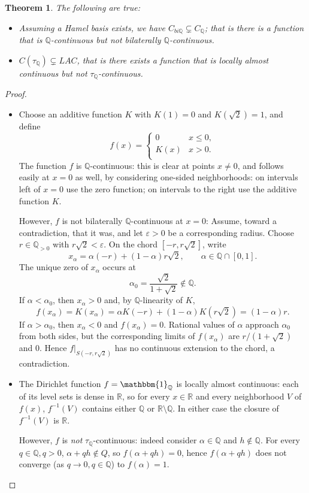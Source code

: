 \documentclass[11pt]{amsart} %
\newtheorem{theorem}{Theorem}[section]
\theoremstyle{definition}
\newcommand{\R}{\mathbb{R}}
\newcommand{\Q}{\mathbb{Q}}
\begin{document}
\begin{theorem} The following are true: 
\begin{itemize} 
\item[(a). ] Assuming a Hamel basis exists, we have $C_{bi\Q}\subsetneq C_{\Q}$; that is there is a function that is $\Q$-continuous but not bilaterally $\Q$-continuous. 
\item[(b). ] $C(\tau_{\Q})\subsetneq LAC$, that is there exists a function that is locally almost continuous but not $\tau_{\Q}$-continuous. 
\end{itemize} 
\end{theorem} 
\begin{proof} 
\begin{itemize} 
\item[(a). ] Choose an additive function $K$ with $K(1)=0$ and $K(\sqrt{2})=1$, and define 
\begin{equation} 
f(x)=\left\{\begin{array}{cc}
0 & x\leq 0, \\
K(x) & x>0. \\
\end{array} 
\right. 
\end{equation} 
The function $f$ is $\Q$-continuous: this is clear at points $x\neq 0$, and follows easily at $x=0$ as well, by considering one-sided neighborhoods: on intervals left of $x=0$ use the zero function; on intervals to the right use the additive function $K$. 


However, $f$ is not bilaterally $\Q$-continuous at $x=0$: 
Assume, toward a contradiction, that it was, and let \(\varepsilon>0\) be a corresponding radius. Choose \(r\in\Q_{>0}\) with \(r\sqrt2<\varepsilon\). On the chord \([-r,r\sqrt2]\), write
\[
 x_\alpha=\alpha(-r)+(1-\alpha)r\sqrt2,
 \qquad \alpha\in\Q\cap[0,1].
\]
The unique zero of \(x_\alpha\) occurs at
\[
 \alpha_0=\frac{\sqrt2}{1+\sqrt2}\notin\Q.
\]
If \(\alpha<\alpha_0\), then \(x_\alpha>0\) and, by \(\Q\)-linearity of \(K\),
\[
 f(x_\alpha)=K(x_\alpha)
 =\alpha K(-r)+(1-\alpha)K(r\sqrt2)
 =(1-\alpha)r.
\]
If \(\alpha>\alpha_0\), then \(x_\alpha<0\) and \(f(x_\alpha)=0\). Rational values of \(\alpha\) approach \(\alpha_0\) from both sides, but the corresponding limits of \(f(x_\alpha)\) are \(r/(1+\sqrt2)\) and \(0\). Hence \(f|_{S(-r,r\sqrt2)}\) has no continuous extension to the chord, a contradiction.
 
\item[(b). ] The Dirichlet function $f=\mathbbm{1}_{\Q}$ is locally almost continuous: each of its level sets is dense in $\R$, so for every $x\in \R$ and every  neighborhood $V$ of $f(x)$, $f^{-1}(V)$ contains either $\Q$ or $\R\setminus \Q$. In either case 
the closure of $f^{-1}(V)$ is $\R$. 

However, $f$ is \emph{not} $\tau_{\Q}$-continuous: indeed consider $\alpha\in \Q$ and $h\not \in \Q$. For every $q\in \Q, q>0$, $\alpha+qh\not \in Q$, so $f(\alpha+qh)=0$, hence $f(\alpha + qh)$ does not converge (as $q\rightarrow 0,q\in \Q$) to $f(\alpha)=1$. 
\end{itemize} 
\end{proof} 
\end{document}

